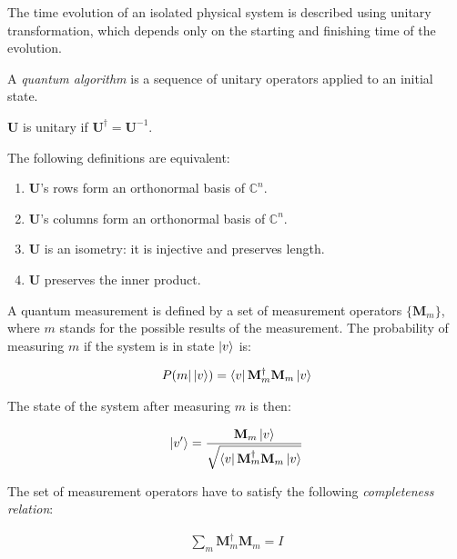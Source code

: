 The time evolution of an isolated physical system is described using unitary transformation, which depends only on the starting and finishing time of the evolution.

A \textit{quantum algorithm} is a sequence of unitary operators applied to an initial state.

\begin{definition}

$\mathbf{U}$ is unitary if $\mathbf{U}^{\dagger} = \mathbf{U}^{-1}$.


The following definitions are equivalent:

\begin{enumerate}
    \item $\mathbf{U}$'s rows form an orthonormal basis of $\mathds{C}^n$.
    \item $\mathbf{U}$'s columns form an orthonormal basis of $\mathds{C}^n$.
    \item $\mathbf{U}$ is an isometry: it is injective and preserves length.
    \item $\mathbf{U}$ preserves the inner product.
\end{enumerate}

\end{definition}


A quantum measurement is defined by a set of measurement operators $\{\mathbf{M}_m\}$, where $m$ stands for the possible results of the measurement. The probability of measuring $m$ if the system is in state $\ket{v}$ is:

\begin{align*}
    P(m | \ket{v}) = \bra{v} \mathbf{M}_m^{\dagger} \mathbf{M}_m \ket{v}
\end{align*}

The state of the system after measuring $m$ is then:

\begin{align*}
    \ket{v'} = \frac{\mathbf{M}_m\ket{v}}{\sqrt{\bra{v} \mathbf{M}_m^{\dagger} \mathbf{M}_m \ket{v}}}
\end{align*}

The set of measurement operators have to satisfy the following \textit{completeness relation}:

\begin{align*}
    \sum\limits_{m}  \mathbf{M}_m^{\dagger} \mathbf{M}_m = I
\end{align*}

